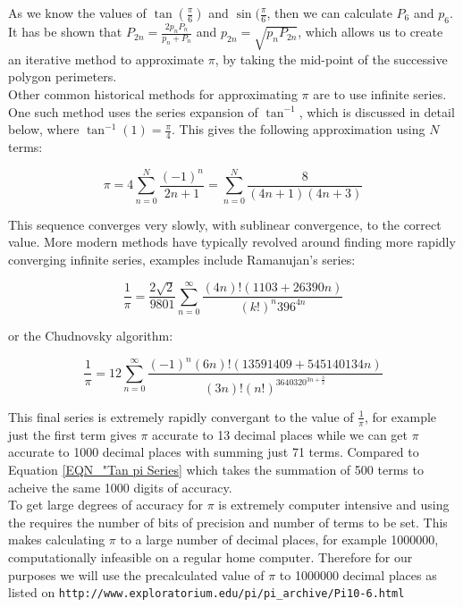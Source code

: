 As we know the values of \(\tan(\frac{\pi}{6})\) and \(\sin(\frac{\pi}{6}\), then we can calculate \(P_6\) and \(p_6\). It has be shown that \(P_{2n} = \frac{2p_nP_n}{p_n + P_n}\) and \(p_{2n} = \sqrt{p_nP_{2n}}\), which allows us to create an iterative method to approximate \(\pi\), by taking the mid-point of the successive polygon perimeters.\\

Other common historical methods for approximating \(\pi\) are to use infinite series. One such method uses the series expansion of \(\tan^{-1}\), which is discussed in detail below, where \(\tan^{-1}(1) = \frac{\pi}{4}\). This gives the following approximation using \(N\) terms:

\begin{equation}
\label{EQN_"Tan pi Series"}
\pi = 4\sum_{n=0}^{N} \frac{(-1)^n}{2n+1} = \sum_{n=0}^N \frac{8}{(4n+1)(4n+3)}
\end{equation}

This sequence converges very slowly, with sublinear convergence, to the correct value. More modern methods have typically revolved around finding more rapidly converging infinite series, examples include Ramanujan's series:

\begin{equation}
\frac{1}{\pi} = \frac{2\sqrt{2}}{9801}\sum_{n=0}^\infty \frac{(4n)!(1103 + 26390n)}{(k!)^n396^{4n}}
\end{equation}

or the Chudnovsky algorithm:

\begin{equation}
\frac{1}{\pi} = 12\sum_{n=0}^\infty \frac{(-1)^n(6n)!(13591409 + 545140134n)}{(3n)!(n!)^3640320^{3n + \frac{3}{2}}}
\end{equation}

This final series is extremely rapidly convergant to the value of \(\frac{1}{\pi}\), for example just the first term gives \(\pi\) accurate to 13 decimal places while we can get \(\pi\) accurate to 1000 decimal places with summing just 71 terms. Compared to Equation \ref{EQN_"Tan pi Series} which takes the summation of 500 terms to acheive the same 1000 digits of accuracy.\\

To get large degrees of accuracy for \(\pi\) is extremely computer intensive and using the  requires the number of bits of precision and number of terms to be set. This makes calculating \(\pi\) to a large number of decimal places, for example 1000000, computationally infeasible on a regular home computer. Therefore for our purposes we will use the precalculated value of \(\pi\) to 1000000 decimal places as listed on \texttt{http://www.exploratorium.edu/pi/pi\_archive/Pi10-6.html}

